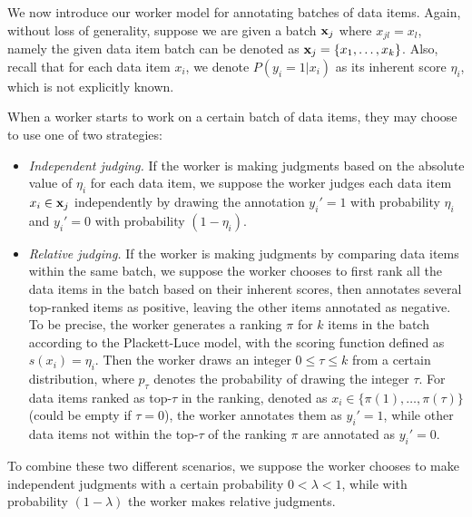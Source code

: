 %

We now introduce our worker model for annotating batches of data items.
Again, without loss of generality, suppose we are given a batch ${\mathbf{x}}_j$ where $x_{jl} = x_l$,
namely the given data item batch can be denoted as ${\mathbf{x}}_j=\{x_1, \ldots, x_k\}$.
Also, recall that for each data item $x_i$, we denote $P(y_i = 1 | x_i)$ as its inherent score $\eta_i$,
which is not explicitly known. 

When a worker starts to work on a certain batch of data items,
they may choose to use one of two strategies:
\begin{itemize}
  \item \emph{Independent judging.}
  If the worker is making judgments based on the absolute value of $\eta_i$ for each data item, 
  we suppose the worker judges each data item $x_i \in {\mathbf{x}}_j$ independently
  by drawing the annotation $y_i'=1$ with probability $\eta_i$ and $y_i' = 0$ with probability $(1 - \eta_i)$.
  \item \emph{Relative judging.}
  If the worker is making judgments by comparing data items within the same batch,
  we suppose the worker chooses to first rank all the data items in the batch based on their inherent scores,
  then annotates several top-ranked items as positive, leaving the other items annotated as negative.
  To be precise, the worker generates a ranking $\pi$ for $k$ items in the batch according to the Plackett-Luce model,
  with the scoring function defined as $s(x_i) = \eta_i$.
  Then the worker draws an integer $0 \leq \tau \leq k$ from a certain distribution,
  where $p_\tau$ denotes the probability of drawing the integer $\tau$.
  For data items ranked as top-$\tau$ in the ranking,
  denoted as $x_i \in \{\pi(1), \ldots, \pi(\tau)\}$ (could be empty if $\tau = 0$),
  the worker annotates them as $y_i'=1$,
  while other data items not within the top-$\tau$ of the ranking $\pi$ are annotated as $y_i' = 0$.
\end{itemize}
To combine these two different scenarios,
we suppose the worker chooses to make independent judgments with a certain probability $0 < \lambda < 1$,
while with probability $(1-\lambda)$ the worker makes relative judgments.

